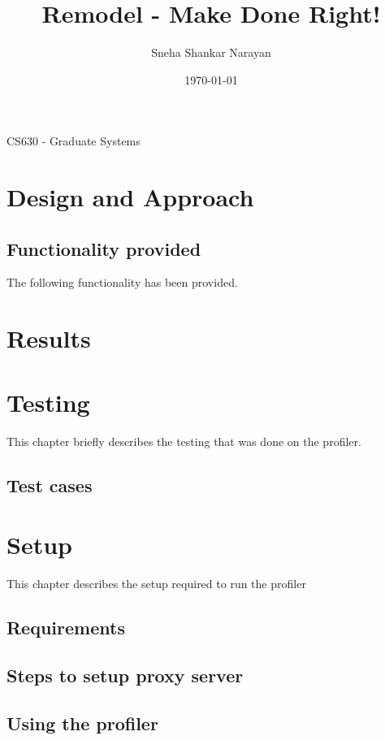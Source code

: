 \documentclass[a4paper, 12pt, notitlepage]{report}
\title{Remodel - Make Done Right! } %
\author{Sneha Shankar Narayan} %
\date{\today} %
\begin{document}
\maketitle
\begin{center}
CS630 - Graduate Systems
\end{center}
\thispagestyle{empty}
\newpage

\tableofcontents


\chapter{Design and Approach}
%


\section{Functionality provided}
%
The following functionality has been provided.



\chapter{Results}
%



\chapter{Testing}
%
This chapter briefly describes the testing that was done on the profiler.

\section{Test cases}

\chapter{Setup}
%
This chapter describes the setup required to run the profiler
\section{Requirements}




\section{Steps to setup proxy server}


\section{Using the profiler}
\end{document}
